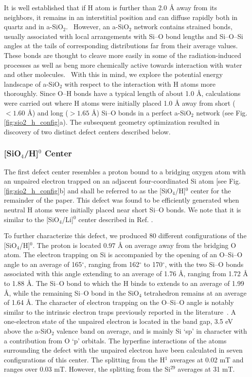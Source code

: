 \documentclass[aps,prb,reprint,superscriptaddress,showpacs]{revtex4-1}
\begin{document}
It is well established that if H atom is further than 2.0 {\AA} away from its neighbors, it remains in an interstitial position and can diffuse rapidly both in quartz and in a-SiO$_2$.~\cite{skuja_hdiffusion,godet_hydrogen,blochl_vacancies} However, an a-SiO$_2$ network contains strained bonds, usually associated with local arrangements with \mbox{Si--O} bond lengths and \mbox{Si--O--Si} angles at the tails of corresponding distributions far from their average values. These bonds are thought to cleave more easily in some of the radiation-induced processes as well as beng more chemically active towards interaction with water and other molecules.~\cite{awazu} With this in mind, we explore the potential energy landscape of a-SiO$_2$ with respect to the interaction with H atoms more thoroughly. Since \mbox{O--H} bonds have a typical length of about 1.0 {\AA}, calculations were carried out where H atoms were initially placed 1.0 {\AA} away from short ($< 1.60$ {\AA}) and long ($> 1.65$ {\AA}) \mbox{Si--O} bonds in a perfect a-SiO$_2$ network (see Fig. \ref{fig:sio2_h_config}a). The subsequent geometry optimization resulted in discovery of two distinct defect centers described below.

\subsubsection*{[SiO$_4$/H]$^0$ Center}

The first defect center resembles a proton bound to a bridging oxygen atom with an unpaired electron trapped on an adjacent four-coordinated Si atom [see Fig. \ref{fig:sio2_h_config}b] and shall be referred to as the [SiO$_4$/H]$^0$ center for the remainder of the paper. This defect was found to be efficiently generated when neutral H atoms were initially placed near short \mbox{Si--O} bonds. We note that it is similar to the [SiO$_4$/Li]$^0$ center described in Ref. \cite{aelsayed_prb}. 

To further characterize this defect, we produced 80 different configurations of the [SiO$_4$/H]$^0$. The proton is located $0.97$ {\AA} on average away from the bridging O atom. The electron trapping on Si is accompanied by the opening of an \mbox{O--Si--O} angle to an average of 165$^\circ$, ranging from 162$^\circ$ to 170$^\circ$, with the two \mbox{Si--O} bonds associated with this angle extending to an average of 1.76 {\AA}, ranging from 1.72 {\AA} to 1.88 {\AA}. The \mbox{Si--O} bond to which the H binds to extends to an average of 1.99 {\AA}, while the remaining \mbox{Si--O} bond in the SiO$_4$ tetrahedron remains at an average of 1.64 {\AA}. The character of electron trapping on the \mbox{O--Si--O} angle is notably similar to the intrinsic electron traps previously reported in the literature~\cite{electron_trap_sio2,aelsayed_prb}. A one-electron state of the unpaired electron is located in the band gap, 3.5 eV above the a-SiO$_2$ valence band on average, and is mainly Si `sp' in character with a contribution from O `p' orbitals. The hyperfine interactions of the atoms surrounding the defect with the unpaired electron have been calculated in seven configurations of this center. The splitting from the H$^1$ averages at 0.02 mT and ranges over 0.03 mT. However, the splitting from the Si$^{29}$ averages at 31 mT. 
\end{document}
